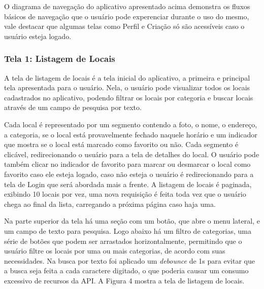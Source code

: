     O diagrama de navegação do aplicativo apresentado acima demonstra os fluxos básicos de navegação que o usuário pode experenciar
    durante o uso do mesmo, vale destacar que algumas telas como Perfil e Criação só são acessíveis caso o usuário esteja logado.

    \FloatBarrier

\subsubsection{Tela 1: Listagem de Locais}

    A tela de listagem de locais é a tela inicial do aplicativo, a primeira e principal tela apresentada para o usuário. Nela, o usuário pode visualizar todos os locais cadastrados no aplicativo, podendo filtrar os locais por categoria e buscar locais através de um campo de pesquisa por texto. 
    
    Cada local é representado por um segmento contendo a foto, o nome, o endereço, a categoria, se o local está provavelmente fechado naquele horário e um indicador que mostra se o local está marcado como favorito ou não. Cada segmento é clicável, redirecionando o usuário para a tela de detalhes do local. O usuário pode também clicar no indicador de favorito para marcar ou desmarcar o local como favorito caso ele esteja logado, caso não esteja o usuário é redirecionando para a tela de Login que será abordada mais a frente. A listagem de locais é paginada, exibindo 10 locais por vez, uma nova requisição é feita toda vez que o usuário chega ao final da lista, carregando a próxima página caso haja uma.

    Na parte superior da tela há uma seção com um botão, que abre o menu lateral, e um campo de texto para pesquisa. Logo abaixo há um filtro de categorias, uma série de botões que podem ser arrastados horizontalmente, permitindo que o usuário filtre os locais por uma ou mais categorias, de acordo com suas necessidades. Na busca por texto foi aplicado um \textit{debounce} de 1s para evitar que a busca seja feita a cada caractere digitado, o que poderia causar um consumo excessivo de recursos da API. A Figura 4 mostra a tela de listagem de locais.

